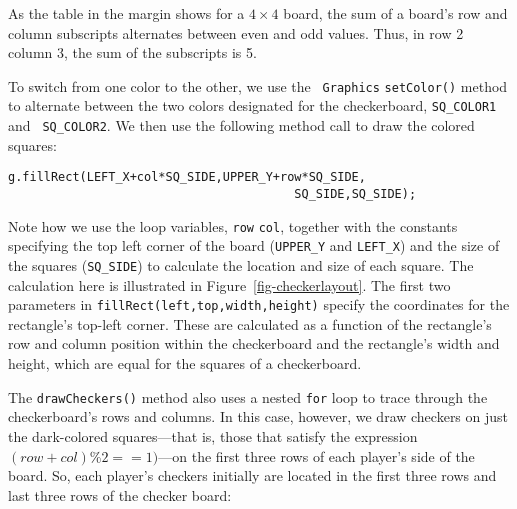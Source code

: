 As the table in the margin shows for a $4 \times 4$ board, the sum of
a board's row and column subscripts alternates between even and odd
values. Thus, in row 2 column 3, the sum of the subscripts is 5.


To switch from one color to the other, we use the {\tt
Graphics} {\tt setColor()} method to alternate between the two colors
designated for the checkerboard, {\tt SQ\_COLOR1} and {\tt
SQ\_COLOR2}.  We then use the following method call to draw the
colored squares:

\begin{jjjlisting}
\begin{lstlisting}
g.fillRect(LEFT_X+col*SQ_SIDE,UPPER_Y+row*SQ_SIDE,
                                        SQ_SIDE,SQ_SIDE);
\end{lstlisting}
\end{jjjlisting}

\noindent Note how we use the loop variables, {\tt row} {\tt col},
together with the constants specifying the top left corner of the
board ({\tt UPPER\_Y} and {\tt LEFT\_X}) and the size of the squares
({\tt SQ\_SIDE}) to calculate the location and size of each square.
The calculation here is illustrated in Figure~\ref{fig-checkerlayout}.
The first two parameters in {\tt fillRect(left,top,width,height)}
specify the coordinates for the rectangle's top-left corner. These
are calculated as a function of the rectangle's row and column
position within the checkerboard and the rectangle's width and
height, which are equal for the squares of a checkerboard.

\begin{figure}[hbt]
\end{figure}

The {\tt drawCheckers()} method also uses a nested {\tt for} loop to
trace through the checkerboard's rows and columns. In this case,
however, we draw checkers on just the dark-colored squares---that is,
those that satisfy the expression $(row+col) \% 2 == 1)$---on the
first three rows of each player's side of the board. So, each player's
checkers initially are located in the first three rows and last three
rows of the checker board:

